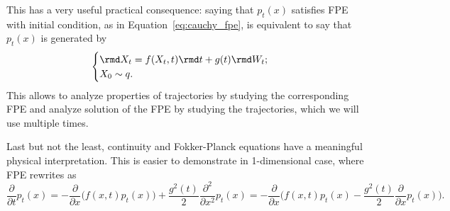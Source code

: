 This has a very useful practical consequence: saying that $p_t(x)$ satisfies FPE with initial condition, as in Equation~\ref{eq:cauchy_fpe}, is equivalent to say that $p_t(x)$ is generated by
\begin{equation}\label{eq:cauchy_sde}
    \begin{cases}
        \rmd X_t = f(X_t, t)\rmd t + g(t) \rmd W_t;\\
        X_0 \sim q.
    \end{cases}
\end{equation}
This allows to analyze properties of trajectories by studying the corresponding FPE and analyze solution of the FPE by studying the trajectories, which we will use multiple times.

Last but not the least, continuity and Fokker-Planck equations have a meaningful physical interpretation. This is easier to demonstrate in 1-dimensional case, where FPE rewrites as
\[
    \frac{\partial}{\partial t} p_t(x) = - \frac{\partial}{\partial x} \Big(f(x, t)p_t(x)\Big) + \frac{g^2(t)}{2}\frac{\partial^2}{\partial x^2}p_t(x) = -\frac{\partial}{\partial x} \Big(f(x, t)p_t(x) - \frac{g^2(t)}{2} \frac{\partial}{\partial x} p_t(x)\Big).
\]


